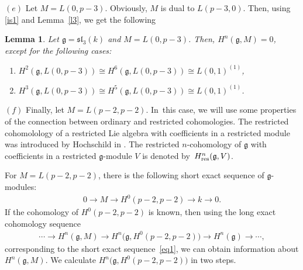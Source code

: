 \documentclass[pdftex]{sigma}%
\numberwithin{equation}{section}
\newtheorem{Lemma}[Theorem]{Lemma}
\begin{document}
$(e)$ Let $M=L(0,p-3)$. Obviously, $M$ is dual to $L(p-3,0)$. Then, using \eqref{is1} and Lemma~\ref{l3}, we get the following

\begin{Lemma}\label{l4}
Let $\mathfrak{g}=\mathfrak{sl}_3(k)$ and $M=L(0,p-3)$. Then, $H^n(\mathfrak{g},M)=0$, except for the following cases:
\begin{enumerate}\itemsep=0pt

\item[$(i)$] $H^2(\mathfrak{g},L(0,p-3))\cong H^6(\mathfrak{g},L(0,p-3))\cong L(0,1)^{(1)}$,

\item[$(ii)$] $H^3(\mathfrak{g},L(0,p-3))\cong H^5(\mathfrak{g},L(0,p-3))\cong L(0,1)^{(1)}$.
\end{enumerate}
\end{Lemma}

$(f)$ Finally, let $M=L(p-2,p-2)$. In~this case, we will use some properties of the connection between ordinary and restricted cohomologies. The restricted cohomolology of a restricted Lie algebra with coefficients in a restricted module was introduced by Hochschild in \cite[p.~561]{Hoch54}. The restricted $n$-cohomology of $\mathfrak{g}$ with coefficients in a restricted $\mathfrak{g}$-module $V$ is denoted by~$H^n_{\rm res}(\mathfrak{g},V)$.

For $M=L(p-2,p-2)$, there is the following short exact sequence of $\mathfrak{g}$-modules:
\begin{gather}
0\longrightarrow M\longrightarrow H^0(p-2,p-2)\longrightarrow k\longrightarrow 0.
\label{eq1}
\end{gather}
If the cohomology of $H^0(p-2,p-2)$ is known, then using the long exact cohomology sequence
\begin{gather}
\cdots\longrightarrow H^n(\mathfrak{g},M)\longrightarrow H^n\big(\mathfrak{g},H^0(p-2,p-2)\big)\longrightarrow H^n(\mathfrak{g})\longrightarrow \cdots,\label{eq12}
\end{gather}
corresponding to the short exact sequence~\eqref{eq1}, we can obtain information about $H^{n}(\mathfrak{g},M)$.
We calculate $H^n\big(\mathfrak{g},H^0(p-2,p-2)\big)$ in two steps.
\end{document}
